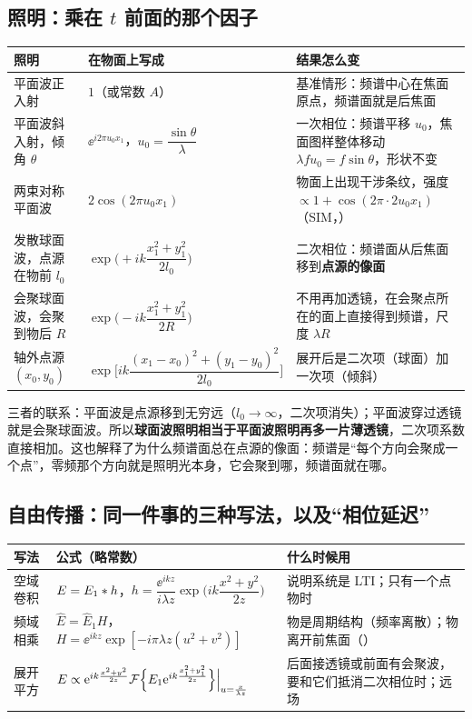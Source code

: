 \subsection*{照明：乘在 $t$ 前面的那个因子}\label{sec:p-illum}
\begin{center}\small\renewcommand{\arraystretch}{1.5}
\begin{tabular}{@{}P{3.1cm}P{4.6cm}P{8.7cm}@{}}
\toprule
照明 & 在物面上写成 & 结果怎么变\\ \midrule
平面波正入射 & $1$（或常数 $A$） & 基准情形：频谱中心在焦面原点，频谱面就是后焦面\\
平面波斜入射，倾角 $\theta$ & $\ee^{i2\pi u_0x_1}$，$u_0=\dfrac{\sin\theta}{\lambda}$ & 一次相位：频谱平移 $u_0$，焦面图样整体移动 $\lambda fu_0=f\sin\theta$，形状不变\\
两束对称平面波 & $2\cos(2\pi u_0x_1)$ & 物面上出现干涉条纹，强度 $\propto1+\cos(2\pi\cdot2u_0x_1)$（SIM，\pageref{ex:v-sim}）\\
发散球面波，点源在物前 $l_0$ & $\exp\!\Big(+ik\dfrac{x_1^2+y_1^2}{2l_0}\Big)$ & 二次相位：频谱面从后焦面移到\textbf{点源的像面}\\
会聚球面波，会聚到物后 $R$ & $\exp\!\Big(-ik\dfrac{x_1^2+y_1^2}{2R}\Big)$ & 不用再加透镜，在会聚点所在的面上直接得到频谱，尺度 $\lambda R$\\
轴外点源 $(x_0,y_0)$ & $\exp\!\Big[ik\dfrac{(x_1-x_0)^2+(y_1-y_0)^2}{2l_0}\Big]$ & 展开后是二次项（球面）加一次项（倾斜）\\
\bottomrule
\end{tabular}
\end{center}
三者的联系：平面波是点源移到无穷远（$l_0\to\infty$，二次项消失）；平面波穿过透镜就是会聚球面波。所以\textbf{球面波照明相当于平面波照明再多一片薄透镜}，二次项系数直接相加。这也解释了为什么频谱面总在点源的像面：频谱是“每个方向会聚成一个点”，零频那个方向就是照明光本身，它会聚到哪，频谱面就在哪。

\subsection*{自由传播：同一件事的三种写法，以及“相位延迟”}\label{sec:p-prop}
\begin{center}\small\renewcommand{\arraystretch}{1.5}
\begin{tabular}{@{}P{2.5cm}P{7.4cm}P{6.5cm}@{}}
\toprule
写法 & 公式（略常数） & 什么时候用\\ \midrule
空域卷积 & $E=E_1\ast h$，$h=\dfrac{\ee^{ikz}}{i\lambda z}\exp\!\Big(ik\dfrac{x^2+y^2}{2z}\Big)$ & 说明系统是 LTI；只有一个点物时\\
频域相乘 & $\hat E=\hat E_1H$，$H=\ee^{ikz}\exp[-i\pi\lambda z(u^2+v^2)]$ & 物是周期结构（频率离散）；物离开前焦面（\pageref{ex:v-4fshift}）\\
展开平方 & $E\propto\mathrm{e}^{ik\frac{x^2+y^2}{2z}}\mathcal{F}\Big\{E_1\mathrm{e}^{ik\frac{x_1^2+y_1^2}{2z}}\Big\}\Big|_{u=\frac{x}{\lambda z}}$ & 后面接透镜或前面有会聚波，要和它们抵消二次相位时；远场\\
\bottomrule
\end{tabular}
\end{center}

